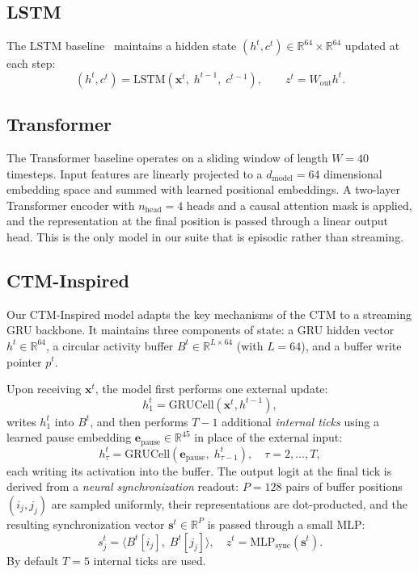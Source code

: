 \documentclass[11pt]{article}
\begin{document}
\subsection{LSTM}

The LSTM baseline~\citep{hochreiter1997long} maintains a hidden state
$(h^t, c^t) \in \mathbb{R}^{64} \times \mathbb{R}^{64}$ updated at each step:
\[
  (h^t, c^t) = \text{LSTM}(\mathbf{x}^t,\; h^{t-1},\; c^{t-1}),
  \qquad z^t = W_\text{out} h^t.
\]

\subsection{Transformer}

The Transformer baseline operates on a sliding window of length $W = 40$
timesteps. Input features are linearly projected to a $d_\text{model} = 64$
dimensional embedding space and summed with learned positional embeddings.
A two-layer Transformer encoder with $n_\text{head} = 4$ heads and a causal
attention mask is applied, and the representation at the final position is
passed through a linear output head. This is the only model in our suite
that is episodic rather than streaming.

\subsection{CTM-Inspired}

Our CTM-Inspired model adapts the key mechanisms of the CTM to a streaming
GRU backbone. It maintains three components of state: a GRU hidden vector
$h^t \in \mathbb{R}^{64}$, a circular activity buffer
$B^t \in \mathbb{R}^{L \times 64}$ (with $L = 64$), and a buffer write
pointer $p^t$.

Upon receiving $\mathbf{x}^t$, the model first performs one external update:
\[
  h^t_1 = \text{GRUCell}(\mathbf{x}^t, h^{t-1}),
\]
writes $h^t_1$ into $B^t$, and then performs $T - 1$ additional
\emph{internal ticks} using a learned pause embedding
$\mathbf{e}_\text{pause} \in \mathbb{R}^{45}$ in place of the external input:
\[
  h^t_\tau = \text{GRUCell}(\mathbf{e}_\text{pause},\; h^t_{\tau-1}),
  \quad \tau = 2, \ldots, T,
\]
each writing its activation into the buffer. The output logit at the final
tick is derived from a \emph{neural synchronization} readout: $P = 128$
pairs of buffer positions $(i_j, j_j)$ are sampled uniformly, their
representations are dot-producted, and the resulting synchronization vector
$\mathbf{s}^t \in \mathbb{R}^{P}$ is passed through a small MLP:
\[
  s^t_j = \langle B^t[i_j],\; B^t[j_j] \rangle, \quad
  z^t = \text{MLP}_\text{sync}(\mathbf{s}^t).
\]
By default $T = 5$ internal ticks are used.
\end{document}
